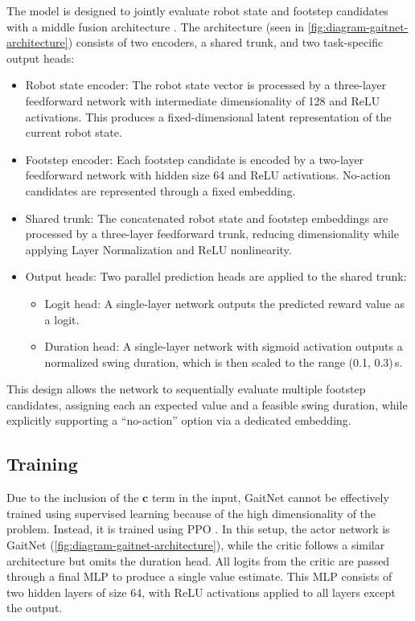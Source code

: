 The model is designed to jointly evaluate robot state and footstep
candidates with a middle fusion architecture \cite{feng2021deep}. The
architecture (seen in \autoref{fig:diagram-gaitnet-architecture})
consists of two encoders, a shared trunk, and two task-specific output heads:

\begin{itemize}
  \item Robot state encoder: The robot state vector is processed by a
    three-layer feedforward network with intermediate dimensionality
    of 128 and ReLU activations. This produces a fixed-dimensional
    latent representation of the current robot state.
  \item Footstep encoder: Each footstep candidate is encoded by a
    two-layer feedforward network with hidden size 64 and ReLU
    activations. No-action candidates are represented through a fixed embedding.
  \item Shared trunk: The concatenated robot state and footstep
    embeddings are processed by a three-layer feedforward trunk,
    reducing dimensionality while applying Layer Normalization and
    ReLU nonlinearity.
  \item Output heads: Two parallel prediction heads are applied to
    the shared trunk:
    \begin{itemize}
      \item Logit head: A single-layer network outputs the predicted
        reward value as a logit.
      \item Duration head: A single-layer network with sigmoid
        activation outputs a normalized swing duration, which is then
        scaled to the range (0.1, 0.3)\,s.
    \end{itemize}
\end{itemize}

This design allows the network to sequentially evaluate multiple
footstep candidates, assigning each an expected value and a feasible
swing duration, while explicitly supporting a “no-action” option via
a dedicated embedding.

\subsection{Training}
\label{subsec:methodology-gaitnet-training}

Due to the inclusion of the $\mathbf{c}$ term in the input, GaitNet
cannot be effectively trained using supervised learning because of
the high dimensionality of the problem. Instead, it is trained using
PPO \cite{Schulman_proximal_2017}. In this setup, the actor network
is GaitNet (\autoref{fig:diagram-gaitnet-architecture}), while the
critic follows a similar architecture but omits the duration head.
All logits from the critic are passed through a final MLP to produce
a single value estimate. This MLP consists of two hidden layers of
size 64, with ReLU activations applied to all layers except the output.

